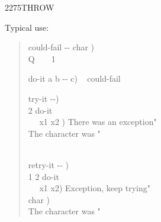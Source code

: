 \begin{worddef}{2275}{THROW}
\begin{rationale}
		Typical use:
		\begin{quote}\ttfamily
			\word{:} could-fail  -{}- char ) \\
			\tab {}  \word{[CHAR]} Q \word{=}~
				~ 1 
			\word{;}

			\word{:} do-it  a b -{}- c) ~
				 could-fail \word{;}

			\word{:} try-it  -{}-) \\
			 2 \word{[']} do-it~ ~  \\
			\tab~~  x1 x2 ) 
				  There was an exception"  \\
			\tab {}
				 The character was "   \\
			\tab {} \\
			\word{;}

			\word{;} retry-it  -{}- ) \\
			\tab {}  1 2 \word{[']} do-it ~
				 \\
			\tab~~  x1 x2) 
				 Exception, keep trying"  \\
			\tab {}  char ) \\
			\tab {} The character was "   \\
			\word{;}
		\end{quote}
	\end{rationale}

	\begin{implement}


\end{implement}
\end{worddef}
